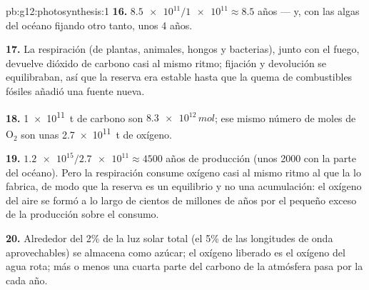 \begin{solution}{pb:g12:photosynthesis:1}
\textbf{16.} $\num{8.5e11}/\num{1e11} \approx 8.5$ años --- y, con las
algas del océano fijando otro tanto, unos 4 años.

\textbf{17.} La respiración (de plantas, animales, hongos y bacterias),
junto con el fuego, devuelve dióxido de carbono casi al mismo ritmo;
fijación y devolución se equilibraban, así que la reserva era estable
hasta que la quema de combustibles fósiles añadió una fuente nueva.

\textbf{18.} \qty{1e11}{t} de carbono son $\num{8.3e12}\,\unit{mol}$;
ese mismo número de moles de $\mathrm{O_2}$ son unas \qty{2.7e11}{t} de
oxígeno.

\textbf{19.} $\num{1.2e15}/\num{2.7e11} \approx 4500$ años de
producción (unos 2000 con la parte del océano). Pero la respiración
consume oxígeno casi al mismo ritmo al que la  lo fabrica,
de modo que la reserva es un equilibrio y no una acumulación: el
oxígeno del aire se formó a lo largo de cientos de millones de años por
el pequeño exceso de la producción sobre el consumo.

\textbf{20.} Alrededor del 2\% de la luz solar total (el 5\% de las
longitudes de onda aprovechables) se almacena como azúcar; el oxígeno
liberado es el oxígeno del agua rota; más o menos una cuarta parte del
carbono de la atmósfera pasa por la  cada año.
\end{solution}
